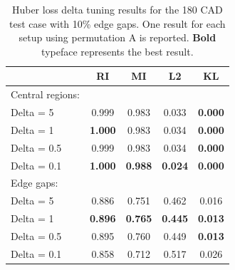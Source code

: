 \documentclass{article}
\begin{document}
\begin{table}[h]
  \caption{Huber loss delta tuning results for the 180 CAD test case with 10\% edge gaps. One result for each setup using permutation A is reported. \textbf{Bold} typeface represents the best result.}
  \label{tab:huber}
  \centering
  \footnotesize
  \begin{tabular}{lcccc}
    \toprule
         & RI     & MI  & L2 & KL \\
    \midrule
    Central regions: & & & & \\
    \; Delta = 5 & 0.999 & 0.983 & 0.033 & \textbf{0.000} \\
    \; Delta = 1 & \textbf{1.000} & 0.983 & 0.034 & \textbf{0.000} \\
    \; Delta = 0.5 & 0.999 & 0.983 & 0.034   & \textbf{0.000} \\
    \; Delta = 0.1 & \textbf{1.000} & \textbf{0.988} & \textbf{0.024} & \textbf{0.000} \\
    \midrule
    Edge gaps: &&&&\\
    \; Delta = 5 & 0.886 & 0.751 & 0.462 & 0.016 \\
    \; Delta = 1 & \textbf{0.896} & \textbf{0.765} & \textbf{0.445} & \textbf{0.013} \\
    \; Delta = 0.5 & 0.895 & 0.760 & 0.449 & \textbf{0.013} \\
    \; Delta = 0.1 & 0.858 & 0.712 & 0.517 & 0.026 \\
    \bottomrule
  \end{tabular}
\end{table}
\end{document}
